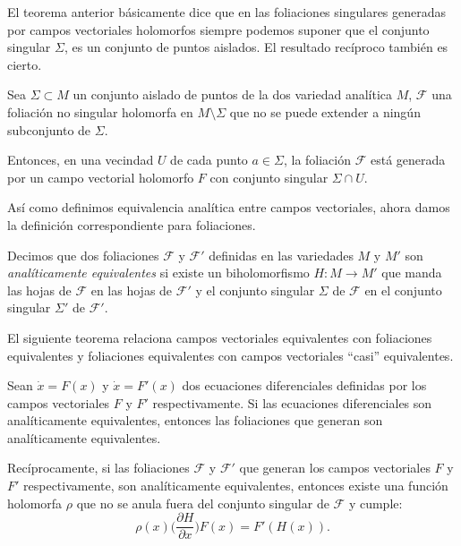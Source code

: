 El teorema anterior básicamente dice que en las foliaciones singulares generadas por campos vectoriales holomorfos siempre podemos suponer que el conjunto singular $\Sigma$, es un conjunto de puntos aislados. El resultado recíproco también es cierto.

\begin{Teorema}
\label{Teo:FoliacionesGeneradas}
\cite{IlyaYako} Sea $\Sigma\subset M$ un conjunto aislado de puntos de la dos variedad analítica $M$, $\mathcal{F}$ una foliación no singular holomorfa en $M\setminus\Sigma$ que no se puede extender a ningún subconjunto de $\Sigma$.

Entonces, en una vecindad $U$ de cada punto $a\in\Sigma$, la foliación $\mathcal{F}$ está generada por un campo vectorial holomorfo $F$ con conjunto singular $\Sigma\cap U$.
\end{Teorema} 

Así como definimos equivalencia analítica entre campos vectoriales, ahora damos la definición correspondiente para foliaciones.

\begin{defn}
Decimos que dos foliaciones $\mathcal{F}$ y $\mathcal{F}'$ definidas en las variedades $M$ y $M'$ son \emph{analíticamente equivalentes} si existe un biholomorfismo $H\colon M\rightarrow M'$ que manda las hojas de $\mathcal{F}$ en las hojas de $\mathcal{F}'$ y el conjunto singular $\Sigma$ de $\mathcal{F}$ en el conjunto singular $\Sigma'$ de $\mathcal{F}'$.
\end{defn}

El siguiente teorema relaciona campos vectoriales equivalentes con foliaciones equivalentes y foliaciones equivalentes con campos vectoriales ``casi'' equivalentes.

\begin{Teorema}
\label{Teo:CamposEquivalentes}
\cite{IlyaYako} Sean $\dot{x}=F(x)$ y $\dot{x}=F'(x)$ dos ecuaciones diferenciales definidas por los campos vectoriales $F$ y $F'$ respectivamente. Si las ecuaciones diferenciales son analíticamente equivalentes, entonces las foliaciones que generan son analíticamente equivalentes.

Recíprocamente, si las foliaciones $\mathcal{F}$ y $\mathcal{F}'$ que generan los campos vectoriales $F$ y $F'$ respectivamente, son analíticamente equivalentes, entonces existe una función holomorfa $\rho$ que no se anula fuera del conjunto singular de $\mathcal{F}$ y cumple:
\begin{equation*}
\rho(x)\Big( \frac{\partial H}{\partial x}\Big)F(x) = F'(H(x)).
\end{equation*} 
\end{Teorema}

